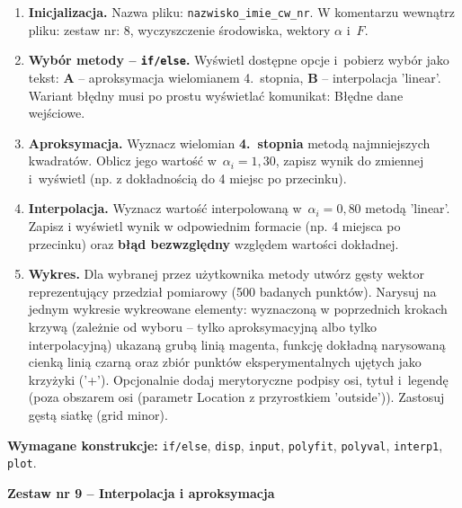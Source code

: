 \documentclass[a4paper,11pt]{article}
\begin{document}
\begin{enumerate}[leftmargin=*, label=\textbf{\arabic*.}, itemsep=2pt]

  \item \textbf{Inicjalizacja.}
    Nazwa pliku: \texttt{nazwisko\_imie\_cw\_nr}. W komentarzu wewnątrz pliku: zestaw nr: 8, wyczyszczenie środowiska, wektory $\alpha$ i~$F$.

  \item \textbf{Wybór metody -- \texttt{if/else}.}
    Wyświetl dostępne opcje i~pobierz wybór jako tekst: \textbf{A} -- aproksymacja wielomianem 4.~stopnia, \textbf{B} -- interpolacja 'linear'. Wariant błędny musi po prostu wyświetlać komunikat: Błędne dane wejściowe.

  \item \textbf{Aproksymacja.}
    Wyznacz wielomian \textbf{4.~stopnia} metodą najmniejszych kwadratów. Oblicz jego wartość w~$\alpha_i = 1{,}30$, zapisz wynik do zmiennej i~wyświetl (np. z dokładnością do 4 miejsc po przecinku).

  \item \textbf{Interpolacja.}
    Wyznacz wartość interpolowaną w~$\alpha_i = 0{,}80$ metodą 'linear'. Zapisz i wyświetl wynik w odpowiednim formacie (np. 4 miejsca po przecinku) oraz \textbf{błąd bezwzględny} względem wartości dokładnej.

  \item \textbf{Wykres.}
    Dla wybranej przez użytkownika metody utwórz gęsty wektor reprezentujący przedział pomiarowy (500 badanych punktów). Narysuj na jednym wykresie wykreowane elementy: wyznaczoną w poprzednich krokach krzywą (zależnie od wyboru -- tylko aproksymacyjną albo tylko interpolacyjną) ukazaną grubą linią magenta, funkcję dokładną narysowaną cienką linią czarną oraz zbiór punktów eksperymentalnych ujętych jako krzyżyki ('+'). Opcjonalnie dodaj merytoryczne podpisy osi, tytuł i~legendę (poza obszarem osi (parametr Location z przyrostkiem 'outside')). Zastosuj gęstą siatkę (grid minor).

\end{enumerate}

\vspace{0.3cm}
\begin{ramka}
\textbf{Wymagane konstrukcje:}
\texttt{if/else}, \texttt{disp}, \texttt{input}, \texttt{polyfit}, \texttt{polyval}, \texttt{interp1}, \texttt{plot}.
\end{ramka}

\clearpage
\begin{center}
  {\large\bfseries Zestaw nr 9 \quad -- \quad Interpolacja i aproksymacja}
\end{center}
\hrulefill
\vspace{0.4cm}
\end{document}
